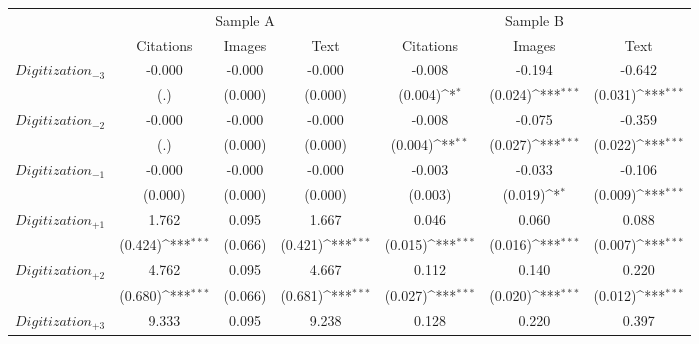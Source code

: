 {
\def\sym#1{\ifmmode^{#1}\else\(^{#1}\)\fi}
\begin{tabular*}{\hsize}{@{\hskip\tabcolsep\extracolsep\fill}l*{6}{c}}
\toprule
            &\multicolumn{3}{c}{Sample A}                                     &\multicolumn{3}{c}{Sample B}                                     \\\cmidrule(lr){2-4}\cmidrule(lr){5-7}
            &\multicolumn{1}{c}{Citations}&\multicolumn{1}{c}{Images}&\multicolumn{1}{c}{Text}&\multicolumn{1}{c}{Citations}&\multicolumn{1}{c}{Images}&\multicolumn{1}{c}{Text}\\
\midrule
$Digitization_{-3}$&      -0.000         &      -0.000         &      -0.000         &      -0.008         &      -0.194         &      -0.642         \\
            &         (.)         &     (0.000)         &     (0.000)         &     (0.004)\sym{*}  &     (0.024)\sym{***}&     (0.031)\sym{***}\\
\addlinespace
$Digitization_{-2}$&      -0.000         &      -0.000         &      -0.000         &      -0.008         &      -0.075         &      -0.359         \\
            &         (.)         &     (0.000)         &     (0.000)         &     (0.004)\sym{**} &     (0.027)\sym{***}&     (0.022)\sym{***}\\
\addlinespace
$Digitization_{-1}$&      -0.000         &      -0.000         &      -0.000         &      -0.003         &      -0.033         &      -0.106         \\
            &     (0.000)         &     (0.000)         &     (0.000)         &     (0.003)         &     (0.019)\sym{*}  &     (0.009)\sym{***}\\
\addlinespace
$Digitization_{+1}$&       1.762         &       0.095         &       1.667         &       0.046         &       0.060         &       0.088         \\
            &     (0.424)\sym{***}&     (0.066)         &     (0.421)\sym{***}&     (0.015)\sym{***}&     (0.016)\sym{***}&     (0.007)\sym{***}\\
\addlinespace
$Digitization_{+2}$&       4.762         &       0.095         &       4.667         &       0.112         &       0.140         &       0.220         \\
            &     (0.680)\sym{***}&     (0.066)         &     (0.681)\sym{***}&     (0.027)\sym{***}&     (0.020)\sym{***}&     (0.012)\sym{***}\\
\addlinespace
$Digitization_{+3}$&       9.333         &       0.095         &       9.238         &       0.128         &       0.220         &       0.397         \\

\end{tabular*}}
